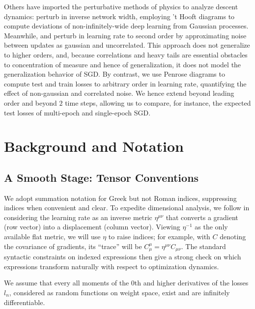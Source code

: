 \documentclass{article}
\begin{document}
    Others have imported the perturbative methods of physics to analyze descent
    dynamics:  \citet{dy19} perturb in inverse network width, employing 't
    Hooft diagrams to compute deviations of non-infinitely-wide deep learning
    from Gaussian processes.  Meanwhile, \cite{ch18} and \citet{li17} perturb
    in learning rate to second order by approximating noise between updates as
    gaussian and uncorrelated.  This approach does not generalize to higher
    orders, and, because correlations and heavy tails are essential obstacles
    to concentration of measure and hence of generalization, it does not model
    the generalization behavior of SGD.  By contrast, we use Penrose diagrams
    to compute test and train losses to arbitrary order in learning rate,
    quantifying the effect of non-gaussian and correlated noise.  We hence
    extend \citet{ro18} beyond leading order and beyond $2$ time steps,
    allowing us to compare, for instance, the expected test losses of
    multi-epoch and single-epoch SGD.


\section{Background and Notation}

\subsection{A Smooth Stage: Tensor Conventions}
    We adopt summation notation for Greek but not Roman indices, suppressing
    indices when convenient and clear.  To expedite dimensional analysis, we
    follow \cite{bo13} in considering the learning rate as an inverse metric
    $\eta^{\mu\nu}$ that converts a gradient (row vector) into a displacement
    (column vector).  Viewing $\eta^{-1}$ as the only available flat metric, we
    will use $\eta$ to raise indices; for example, with $C$ denoting the
    covariance of gradients, its ``trace'' will be $C^{\mu}_{\mu} =
    \eta^{\mu\nu} C_{\mu\nu}$.  The standard syntactic constraints on indexed
    expressions then give a strong check on which expressions transform
    naturally with respect to optimization dynamics.
    
    We assume that every all moments of the $0$th and higher derivatives of the
    losses $l_n$, considered as random functions on weight space, exist and are
    infinitely differentiable.
    
\end{document}
